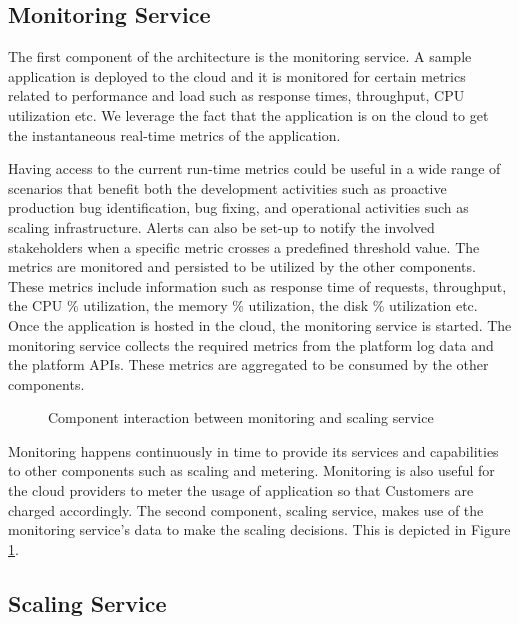 \documentclass[article,type=msc,colorback,12pt,accentcolor=tud8b,table]{tudthesis}
\begin{document}
	\subsection{Monitoring Service} 
 	The first component of the architecture is the monitoring service. A sample application is deployed to the cloud and it is monitored for certain metrics related to performance and load such as response times, throughput, CPU utilization etc. We leverage the fact that the application is on the cloud to get the instantaneous real-time metrics of the application. 
 	\par Having access to the current run-time metrics could be useful in a wide range of scenarios that benefit both the development activities such as proactive production bug identification, bug fixing, and operational activities such as scaling infrastructure. Alerts can also be set-up to notify the involved stakeholders when a specific metric crosses a predefined threshold value. The metrics are monitored and persisted to be utilized by the other components. These metrics include information such as response time of requests, throughput, the CPU \% utilization, the memory \% utilization, the disk \% utilization etc. Once the application is hosted in the cloud, the monitoring service is started. 	The monitoring service collects the required metrics from the platform log data and the platform APIs. These metrics are aggregated to be consumed by the other components. 
 	
 	 	 \begin{figure}[!h]
 	 	 	\begin{center}
 	 	 	\end{center}
 	 	 	\caption{Component interaction between monitoring and scaling service}
 	 	 	\label{fig:monitor_scaling}
 	 	 \end{figure}
 	 	 
 	 	 Monitoring happens continuously in time to provide its services and capabilities to other components such as scaling and metering. Monitoring is also useful for the cloud providers to meter the usage of application so that Customers are charged accordingly. The second component, scaling service, makes use of the monitoring service's data to make the scaling decisions. This is depicted in Figure \ref{fig:monitor_scaling}.
 	
 	\subsection{Scaling Service}
 	
\end{document}
